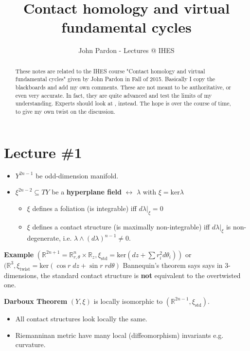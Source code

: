 \documentclass[12pt]{article}
\title{Contact homology and virtual fundamental cycles}
\author{John Pardon - Lectures @ IHES}
\date{}
\begin{document}
{\selectfont

\maketitle

\begin{abstract}
These notes are related to the IHES course "Contact homology and virtual fundamental cycles" given by John Pardon in Fall of 2015.  Basically I copy the blackboards and add my own comments.  These are not meant to be authoritative, or even very accurate.  In fact, they are quite advanced and test the limits of my understanding. Experts should look at \cite{P}, instead. The hope is over the course of time, to give my own twist on the discussion.
\end{abstract}

\section{Lecture \#1}
 

\begin{itemize}
\item $Y^{2n-1}$ be odd-dimension manifold.
\item $\xi^{2n-2} \subseteq TY$ be a \textbf{hyperplane field} $\longleftrightarrow$ $\lambda$ with $\xi = \mathrm{ker} \lambda$
\begin{itemize}
\item $\xi$ defines a foliation (is integrable) iff $d\lambda|_\xi = 0$
\item $\xi$ defines a contact structure (is maximally non-integrable) 
iff $d\lambda|_\xi$ is non-degenerate, i.e. $\lambda \wedge (d\lambda)^{n-1} \neq 0$.
\end{itemize}
\end{itemize}

\noindent \textbf{Example}  $(\mathbb{R}^{2n+1} = \mathbb{R}_{r,\theta}^n \times \mathbb{R}_z, \xi_{\text{std}} = \mathrm{ker}(dz + \sum r_i^2 d\theta_i)) $ or $(\mathbb{R}^3, \xi_{\text{twist}} = \mathrm{ker}( \cos r \; dz + \sin r \; r d\theta) $  Bannequin's theorem says says in 3-dimensions, the standard contact structure is \textbf{not} equivalent to the overtwisted one. \newline

\noindent \textbf{Darboux Theorem} $(Y, \xi)$ is locally isomorphic to $(\mathbb{R}^{2n-1}, \xi_\text{std})$.  
\begin{itemize}
	\item All contact structures look locally the same. 
	\item Riemanninan metric have many local (diffeomorphism) invariants e.g. curvature. 
\end{itemize}

}
\end{document}
